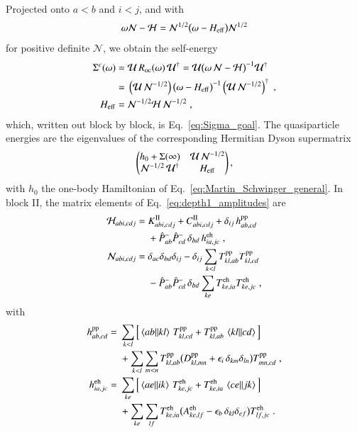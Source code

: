 \documentclass[aip,jcp,reprint,noshowkeys,superscriptaddress]{revtex4-1}
\newcommand{\eps}{\epsilon}
\newcommand{\eh}{\text{eh}}
\newcommand{\pp}{\text{pp}}
\begin{document}
Projected onto $a<b$ and
$i<j$, and with
\begin{equation}
\omega\mathcal N-\mathcal H
=
\mathcal N^{1/2}\big(\omega-H_{\rm eff}\big)\mathcal N^{1/2}
\nonumber
\end{equation}
for positive definite $\mathcal N$, we obtain the self-energy
\begin{equation}
\begin{aligned}
\Sigma^{c}(\omega)
={}&
\mathcal U\,R_{\rm oc}(\omega)\,\mathcal U^{\dagger}
=
\mathcal U\big(\omega\,\mathcal N-\mathcal H\big)^{-1}
\mathcal U^{\dagger}
\\
={}&
\left(\mathcal U\,\mathcal N^{-1/2}\right)
\big(\omega-H_{\rm eff}\big)^{-1}
\left(\mathcal U\,\mathcal N^{-1/2}\right)^\dagger \;,
\\
H_{\rm eff}
={}&
\mathcal N^{-1/2}\mathcal H\,\mathcal N^{-1/2} \;,
\end{aligned}
\label{eq:Heff_depth1}
\end{equation}
which, written out block by block, is Eq.~\eqref{eq:Sigma_goal}.
The quasiparticle energies are the eigenvalues of the corresponding
Hermitian Dyson supermatrix
\begin{equation}
\begin{pmatrix}
h_0+\Sigma(\infty) & \mathcal U\,\mathcal N^{-1/2}
\\
\mathcal N^{-1/2}\,\mathcal U^\dagger & H_{\rm eff}
\end{pmatrix} ,
\nonumber
\end{equation}
with $h_0$ the one-body Hamiltonian of
Eq.~\eqref{eq:Martin_Schwinger_general}.
In block II, the matrix elements of Eq.~\eqref{eq:depth1_amplitudes} are
\begin{align}
\mathcal H_{abi,cdj}
={}&
K^{\rm II}_{abi,cdj}+C^{\rm II}_{abi,cdj}
+\delta_{ij}\,h^{\pp}_{ab,cd}
\nonumber\\
&+\hat P^-_{ab}\hat P^-_{cd}\,\delta_{bd}\,h^{\eh}_{ia,jc} \;,
\nonumber\\
\mathcal N_{abi,cdj}
={}&
\delta_{ac}\delta_{bd}\delta_{ij}
-\delta_{ij}\sum_{k<l}T^{\pp}_{kl,ab}T^{\pp}_{kl,cd}
\nonumber\\
&-\hat P^-_{ab}\hat P^-_{cd}\,\delta_{bd}\sum_{ke}T^{\eh}_{ke,ia}T^{\eh}_{ke,jc} \;,
\label{eq:HN_explicit}
\end{align}
with
\begin{align}
h^{\pp}_{ab,cd}
={}&
\sum_{k<l}\Big[\mel{ab}{}{kl}\,T^{\pp}_{kl,cd}+T^{\pp}_{kl,ab}\,\mel{kl}{}{cd}\Big]
\nonumber\\
&+\sum_{k<l}\sum_{m<n}T^{\pp}_{kl,ab}
\big(D^{\pp}_{kl,mn}+\eps_i\,\delta_{km}\delta_{ln}\big)T^{\pp}_{mn,cd} \;,
\nonumber\\
h^{\eh}_{ia,jc}
={}&
\sum_{ke}\Big[\mel{ae}{}{ik}\,T^{\eh}_{ke,jc}+T^{\eh}_{ke,ia}\,\mel{ce}{}{jk}\Big]
\nonumber\\
&+\sum_{ke}\sum_{lf}T^{\eh}_{ke,ia}
\big(A^{\eh}_{ke,lf}-\eps_b\,\delta_{kl}\delta_{ef}\big)T^{\eh}_{lf,jc} \;.
\label{eq:h_pair}
\end{align}
\end{document}
